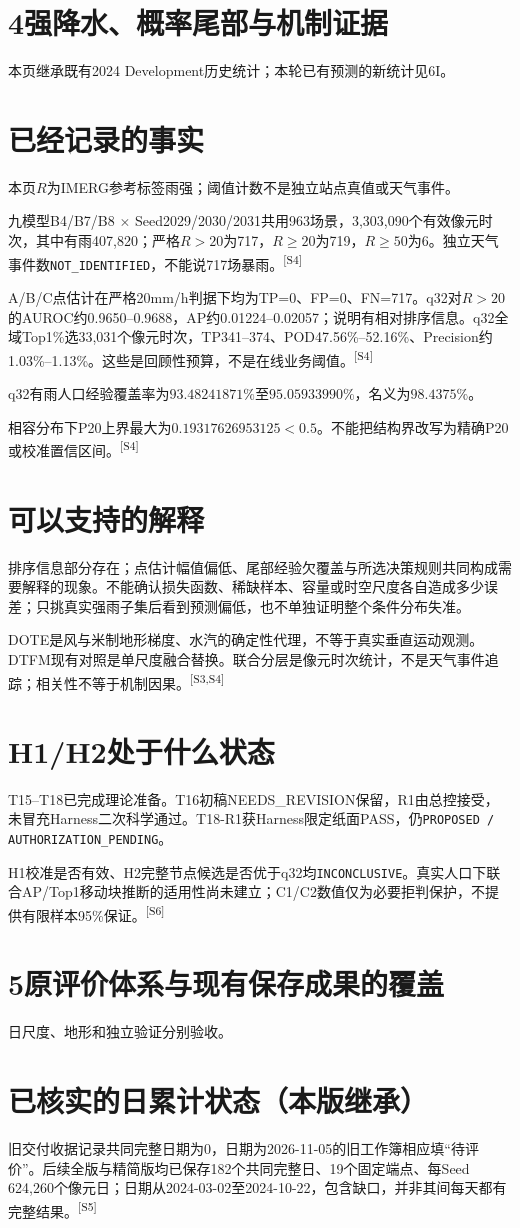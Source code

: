 \documentclass[UTF8,10.5pt,a4paper,fontset=none]{ctexart}
\newcommand{\evi}[1]{\textsuperscript{\color{muted}[#1]}}
\newcommand{\pageheading}[2]{\clearpage\section*{#1}\textcolor{muted}{#2}\par\vspace{3pt}}
\begin{document}
\pageheading{4\quad 强降水、概率尾部与机制证据}{本页继承既有2024 Development历史统计；本轮已有预测的新统计见6I。}
\section*{已经记录的事实}
本页$R$为IMERG参考标签雨强；阈值计数不是独立站点真值或天气事件。

九模型B4/B7/B8 $\times$ Seed2029/2030/2031共用963场景，3,303,090个有效像元时次，其中有雨407,820；严格$R>20$为717，$R\ge20$为719，$R\ge50$为6。独立天气事件数\texttt{NOT\_IDENTIFIED}，不能说717场暴雨。\evi{S4}

A/B/C点估计在严格20mm/h判据下均为TP=0、FP=0、FN=717。q32对$R>20$的AUROC约0.9650--0.9688，AP约0.01224--0.02057；说明有相对排序信息。q32全域Top1\%选33,031个像元时次，TP341--374、POD47.56\%--52.16\%、Precision约1.03\%--1.13\%。这些是回顾性预算，不是在线业务阈值。\evi{S4}

q32有雨人口经验覆盖率为$93.48241871\%$至$95.05933990\%$，名义为$98.4375\%$。\par
相容分布下P20上界最大为$0.19317626953125<0.5$。不能把结构界改写为精确P20或校准置信区间。\evi{S4}

\section*{可以支持的解释}
排序信息部分存在；点估计幅值偏低、尾部经验欠覆盖与所选决策规则共同构成需要解释的现象。不能确认损失函数、稀缺样本、容量或时空尺度各自造成多少误差；只挑真实强雨子集后看到预测偏低，也不单独证明整个条件分布失准。

DOTE是风与米制地形梯度、水汽的确定性代理，不等于真实垂直运动观测。DTFM现有对照是单尺度融合替换。联合分层是像元时次统计，不是天气事件追踪；相关性不等于机制因果。\evi{S3,S4}

\section*{H1/H2处于什么状态}
T15--T18已完成理论准备。T16初稿NEEDS\_REVISION保留，R1由总控接受，未冒充Harness二次科学通过。T18-R1获Harness限定纸面PASS，仍\texttt{PROPOSED / AUTHORIZATION\_PENDING}。

H1校准是否有效、H2完整节点候选是否优于q32均\texttt{INCONCLUSIVE}。真实人口下联合AP/Top1移动块推断的适用性尚未建立；C1/C2数值仅为必要拒判保护，不提供有限样本95\%保证。\evi{S6}

\pageheading{5\quad 原评价体系与现有保存成果的覆盖}{日尺度、地形和独立验证分别验收。}
\section*{已核实的日累计状态（本版继承）}
旧交付收据记录共同完整日期为0，日期为2026-11-05的旧工作簿相应填“待评价”。后续全版与精简版均已保存182个共同完整日、19个固定端点、每Seed 624,260个像元日；日期从2024-03-02至2024-10-22，包含缺口，并非其间每天都有完整结果。\evi{S5}
\end{document}
